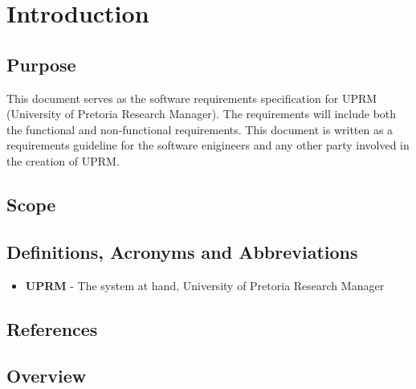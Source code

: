 \section{Introduction}

	\subsection{Purpose}
		This document serves as the software requirements specification for UPRM (University of Pretoria Research Manager). 
		The requirements will include both the functional and non-functional requirements. 
		This document is written as a requirements guideline for the software enigineers and any other party involved in the creation of UPRM.
	\subsection{Scope}
	\subsection{Definitions, Acronyms and Abbreviations}
		\begin{itemize}
			\item{\textbf{UPRM}} - The system at hand, University of Pretoria Research Manager
		\end{itemize}
	\subsection{References}
	\subsection{Overview}